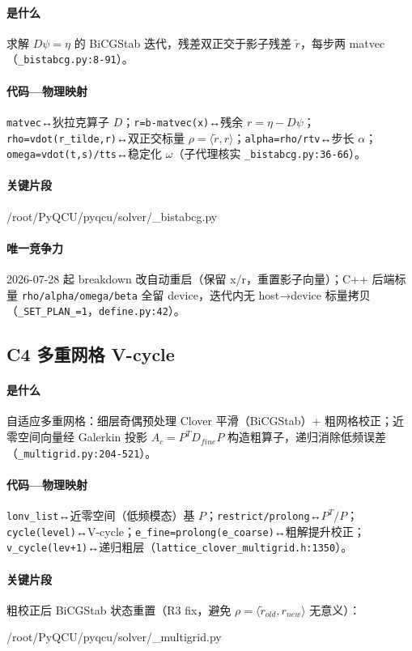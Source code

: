 \documentclass[UTF8]{ctexart}
\begin{document}
\paragraph{是什么} 求解 $D\psi=\eta$ 的 BiCGStab 迭代，残差双正交于影子残差 $\tilde r$，每步两 matvec（\nolinkurl{_bistabcg.py:8-91}）。
\paragraph{代码—物理映射} \nolinkurl{matvec}↔狄拉克算子 $D$；\nolinkurl{r=b-matvec(x)}↔残余 $r=\eta-D\psi$；\nolinkurl{rho=vdot(r_tilde,r)}↔双正交标量 $\rho=\langle\tilde r,r\rangle$；\nolinkurl{alpha=rho/rtv}↔步长 $\alpha$；\nolinkurl{omega=vdot(t,s)/tts}↔稳定化 $\omega$（子代理核实 \nolinkurl{_bistabcg.py:36-66}）。
\paragraph{关键片段}
\begin{lstinputlisting}[firstline=36,lastline=66,language=python]{/root/PyQCU/pyqcu/solver/_bistabcg.py}
\end{lstinputlisting}
\paragraph{唯一竞争力} 2026-07-28 起 breakdown 改自动重启（保留 x/r，重置影子向量）；C++ 后端标量 \texttt{rho/alpha/omega/beta} 全留 device，迭代内无 host→device 标量拷贝（\texttt{\_SET\_PLAN\_=1}，\texttt{define.py:42}）。

\subsection{C4 多重网格 V-cycle}
\paragraph{是什么} 自适应多重网格：细层奇偶预处理 Clover 平滑（BiCGStab）+ 粗网格校正；近零空间向量经 Galerkin 投影 $A_c=P^T D_{fine} P$ 构造粗算子，递归消除低频误差（\texttt{\_multigrid.py:204-521}）。
\paragraph{代码—物理映射} \nolinkurl{lonv_list}↔近零空间（低频模态）基 $P$；\nolinkurl{restrict/prolong}↔$P^T/P$；\nolinkurl{cycle(level)}↔V-cycle；\nolinkurl{e_fine=prolong(e_coarse)}↔粗解提升校正；\nolinkurl{v_cycle(lev+1)}↔递归粗层（\nolinkurl{lattice_clover_multigrid.h:1350}）。
\paragraph{关键片段} 粗校正后 BiCGStab 状态重置（R3 fix，避免 $\rho=\langle\tilde r_{old},r_{new}\rangle$ 无意义）：
\begin{lstinputlisting}[firstline=465,lastline=482,language=python]{/root/PyQCU/pyqcu/solver/_multigrid.py}
\end{lstinputlisting}
\end{document}
